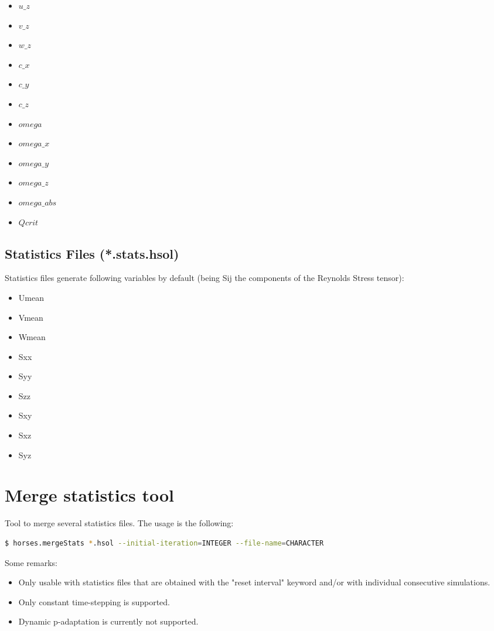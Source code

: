 \documentclass[a4paper,10pt]{report}
\begin{document}
\begin{multicols}{5}
\begin{itemize}
\item $u\_z$
\item $v\_z$
\item $w\_z$
\item $c\_x$
\item $c\_y$
\item $c\_z$
\item $omega$
\item $omega\_x$
\item $omega\_y$
\item $omega\_z$
\item $omega\_abs$
\item $Qcrit$
\end{itemize}
\end{multicols}

\subsection{Statistics Files (*.stats.hsol)}
Statistics files generate following variables by default (being Sij the components of the Reynolds Stress tensor):

\begin{multicols}{3}
\begin{itemize}
\item Umean
\item Vmean
\item Wmean
\item Sxx
\item Syy
\item Szz
\item Sxy
\item Sxz
\item Syz
\end{itemize}
\end{multicols}

\section{Merge statistics tool}

Tool to merge several statistics files. The usage is the following:

\begin{lstlisting}[language=bash]
	$ horses.mergeStats *.hsol --initial-iteration=INTEGER --file-name=CHARACTER
\end{lstlisting}

Some remarks:
\begin{itemize}
\item Only usable with statistics files that are obtained with the "reset interval" keyword and/or with individual consecutive simulations. 
\item Only constant time-stepping is supported.
\item Dynamic p-adaptation is currently not supported.
\end{itemize}
\end{document}
